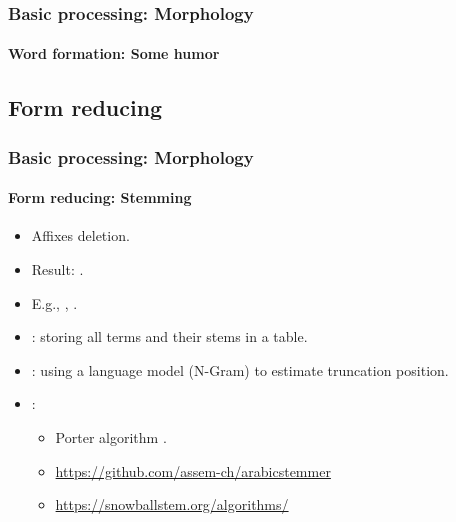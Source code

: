 \documentclass[xcolor=table]{beamer}
\begin{document}
\begin{frame}
\frametitle{Basic processing: Morphology}
\framesubtitle{Word formation: Some humor}

\begin{center}
\end{center}

\end{frame}

\subsection{Form reducing}

\begin{frame}
\frametitle{Basic processing: Morphology}
\framesubtitle{Form reducing: Stemming}

\begin{itemize}
	\item Affixes deletion.
	\item Result: .
	\item E.g., , .
	\item {}: storing all terms and their stems in a table.
	\item {}: using a language model (N-Gram) to estimate truncation position.
	\item {}:
	\begin{itemize}
		\item Porter algorithm \cite{1980-porter}.
		\item \url{https://github.com/assem-ch/arabicstemmer}
		\item \url{https://snowballstem.org/algorithms/}
	\end{itemize}
\end{itemize}

\end{frame}
\end{document}
